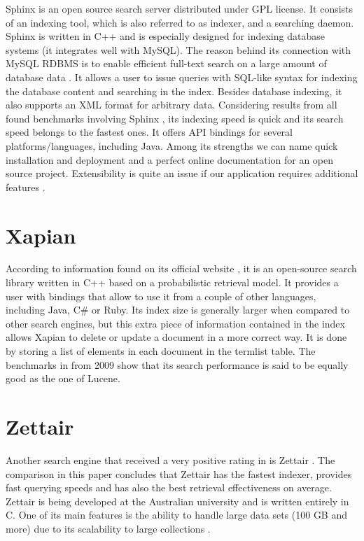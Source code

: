 Sphinx \cite{SphinxHome} is an open source search server distributed under GPL license. 
It consists of an indexing tool, which is also referred to as indexer, and a searching daemon. 
Sphinx is written in C++ and is especially designed for indexing database systems (it integrates well with MySQL).
The reason behind its connection with MySQL RDBMS is to enable efficient full-text search on a large amount of database data \cite{aksyonoff2011introduction}.
It allows a user to issue queries with SQL-like syntax for indexing the database content and searching in the index.
Besides database indexing, it also supports an XML format for arbitrary data. 
Considering results from all found benchmarks involving Sphinx \cite{IndriHome,MiddletonBaeza,BenchmarkLuceneSphinxNewer,BenchmarkMysqlLuceneSphinx}, its indexing speed is quick and its search speed belongs to the fastest ones. 
It offers API bindings for several platforms/languages, including Java. 
Among its strengths we can name quick installation and deployment and a perfect online documentation for an open source project. 
Extensibility is quite an issue if our application requires additional features
\cite{esSphinxLuceneSolXapianWhich}. 

\section{Xapian}

According to information found on its official website \cite{XapianHome}, it is an open-source search library written in C++ based on a probabilistic retrieval model. 
It provides a user with bindings that allow to use it from a couple of other languages, including Java, C\# or Ruby. 
Its index size is generally larger when compared to other search engines, but this extra piece of information contained in the index allows Xapian to delete or update a document in a more correct way. 
It is done by storing a list of elements in each document in the termlist table\cite{XapianIndexSize}. 
The benchmarks in \cite{SinghSearchEngines} from 2009 show that its search performance is said to be equally good as the one of Lucene.

\section{Zettair}

Another search engine that received a very positive rating in \cite{MiddletonBaeza} is Zettair \cite{ZettairHome}. 
The comparison in this paper concludes that Zettair has the fastest indexer, provides fast querying speeds and has also the best retrieval effectiveness on average. 
Zettair is being developed at the Australian university and is written entirely in C. 
One of its main features is the ability to handle large data sets (100 GB and more) due to its scalability to large collections \cite{ZettairHome}.

